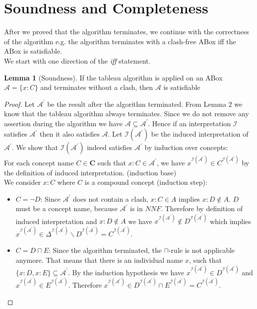 \documentclass{book}
\theoremstyle{break}
\theoremstyle{definition}
\newtheorem{mylem}{Lemma}
\begin{document}
\section{Soundness and Completeness}
After we proved that the algorithm terminates, we continue with the correctness of the algorithm e.g. the algorithm terminates with a clash-free ABox iff the ABox is satisfiable.\\
We start with one direction of the \textit{iff} statement.
\begin{mylem}[Soundness]
If the tableau algorithm is applied on an ABox $\mathcal{A}=\{x:C\}$ and  terminates without a clash, then $\mathcal{A}$ is satisfiable
\end{mylem}
\begin{proof}
Let $\mathcal{A}^\prime$ be the result after the algorithm terminated. From Lemma 2 we know that the tableau algorithm always terminates. Since we do not remove any assertion during the algorithm we have $\mathcal{A}\subseteq\mathcal{A}^\prime$. Hence if an interpretation $\mathcal{I}$ satisfies $\mathcal{A}^\prime$ then it also satisfies $\mathcal{A}$. Let $\mathcal{I}(\mathcal{A}^\prime)$ be the induced interpretation of $\mathcal{A}^\prime$. We show that $\mathcal{I}(\mathcal{A}^\prime)$ indeed satisfies $\mathcal{A}^\prime$ by induction over concepts:\\
For each concept name $C\in\mathbf{C}$ such that $x:C\in\mathcal{A}^\prime$, we have $x^{\mathcal{I}(\mathcal{A}^\prime)}\in C^{\mathcal{I}(\mathcal{A}^\prime)}$ by the definition of induced interpretation. (induction base)\\
We consider $x:C$ where $C$ is a compound concept (induction step):
\begin{itemize}
\item $C=\neg D$: Since $\mathcal{A}^\prime$ does not contain a clash, $x:C\in A$ implies $x:D\notin A$. $D$ must be a concept name, because $\mathcal{A}^\prime$ is in $NNF$. Therefore by definition of induced interpretation and $x:D\notin A$ we have $x^{\mathcal{I}(\mathcal{A}^\prime)}\notin D^{\mathcal{I}(\mathcal{A}^\prime)}$ which implies $x^{\mathcal{I}(\mathcal{A}^\prime)}\in \Delta^{\mathcal{I}(\mathcal{A}^\prime)}\backslash D^{\mathcal{I}(\mathcal{A}^\prime)}=C^{\mathcal{I}(\mathcal{A}^\prime)}$.
\item $C=D\sqcap E$: Since the algorithm terminated, the $\sqcap$-rule is not applicable anymore. That means that there is an individual name $x$, such that $\{x:D, x:E\}\subseteq \mathcal{A}^\prime$. By the induction hypothesis we have $x^{\mathcal{I}(\mathcal{A}^\prime)}\in D^{\mathcal{I}(\mathcal{A}^\prime)}$ and $x^{\mathcal{I}(\mathcal{A}^\prime)}\in E^{\mathcal{I}(\mathcal{A}^\prime)}$. Therefore $x^{\mathcal{I}(\mathcal{A}^\prime)}\in D^{\mathcal{I}(\mathcal{A}^\prime)}\cap E^{\mathcal{I}(\mathcal{A}^\prime)}=C^{\mathcal{I}(\mathcal{A}^\prime)}$.

\end{itemize}
\end{proof}
\end{document}
